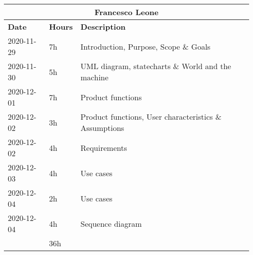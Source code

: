 \begin{table}[H]
    \centering
    \begin{tabular}{|l|l|l|}
        \multicolumn{3}{c}{\textbf{Francesco Leone}}                      \\
        \hline
        \textbf{Date} & \textbf{Hours} & \textbf{Description}              \\\hline
        2020-11-29    & 7h             & Introduction, Purpose, Scope \& Goals                  \\\hline
        2020-11-30    & 5h             & UML diagram, statecharts \& World and the machine      \\\hline
        2020-12-01    & 7h             & Product functions                                      \\\hline
        2020-12-02    & 3h             & Product functions, User characteristics \& Assumptions \\\hline
        2020-12-02    & 4h             & Requirements                                           \\\hline
        2020-12-03    & 4h             & Use cases                                              \\\hline
        2020-12-04    & 2h             & Use cases                                              \\\hline
        2020-12-04    & 4h             & Sequence diagram                                       \\\hline\hline
                      & 36h            &                                                        \\\hline
    \end{tabular}
\end{table}